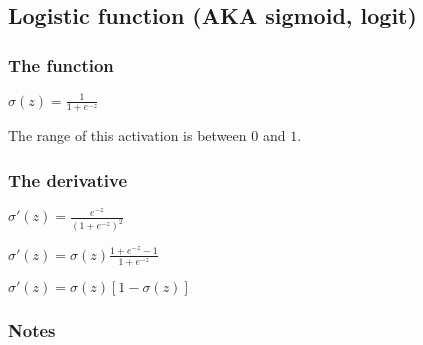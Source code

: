 
\subsection{Logistic function (AKA sigmoid, logit)}

\subsubsection{The function}

\(\sigma (z)=\frac{1}{1+e^{-z}}\)

The range of this activation is between \(0\) and \(1\).

\subsubsection{The derivative}

\(\sigma '(z)=\frac{e^{-z}}{(1+e^{-z})^2}\)

\(\sigma '(z)=\sigma (z)\frac{1+e^{-z}-1}{1+e^{-z}}\)

\(\sigma '(z)=\sigma (z)[1-\sigma (z)]\)

\subsubsection{Notes}


